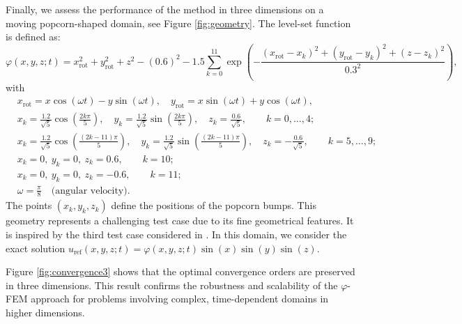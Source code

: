 \documentclass[11pt,a4paper]{article}
\theoremstyle{plain}
\theoremstyle{definition}
\theoremstyle{remark}
\numberwithin{equation}{section}
\begin{document}
\noindent Finally, we assess the performance of the method in three dimensions on a moving popcorn-shaped domain, see Figure \ref{fig:geometry}. The level-set function is defined as:
\begin{equation*}
    \varphi(x,y,z;t) = x_{\text{rot}}^2 + y_{\text{rot}}^2 + z^2 - (0.6)^2 - 1.5 \sum_{k=0}^{11} \exp \left(-\frac{(x_{\text{rot}} - x_k)^2 + (y_{\text{rot}} - y_k)^2 + (z - z_k)^2}{0.3^2} \right),
\end{equation*}
with
\begin{align*}
    &x_{\text{rot}} = x \cos(\omega t) - y \sin(\omega t), \quad 
    y_{\text{rot}} = x \sin(\omega t) + y \cos(\omega t),\\
    &x_k = \frac{1.2}{\sqrt{5}} \cos\left(\frac{2 k \pi}{5}\right),\quad
    y_k = \frac{1.2}{\sqrt{5}} \sin\left(\frac{2 k \pi}{5}\right),\quad
    z_k = \frac{0.6}{\sqrt{5}}, \qquad k=0,\dots,4;\\
    &x_k = \frac{1.2}{\sqrt{5}} \cos\left(\frac{(2k - 11)\pi}{5}\right),\quad
    y_k = \frac{1.2}{\sqrt{5}} \sin\left(\frac{(2k - 11)\pi}{5}\right),\quad
    z_k = -\frac{0.6}{\sqrt{5}}, \qquad k=5,\dots,9;\\
    &x_k = 0,\ y_k = 0,\ z_k = 0.6, \qquad k=10;\\
    &x_k = 0,\ y_k = 0,\ z_k = -0.6, \qquad k=11;\\
    &\omega = \frac{\pi}{8} \quad \text{(angular velocity)}.
\end{align*}
The points $(x_k,y_k,z_k)$ define the positions of the popcorn bumps. This geometry represents a challenging test case due to its fine {geometrical} features. It is inspired by the third test case considered in \cite{heat}.%
In this domain, we consider the exact solution $u_{\mathrm{ref}}(x,y,z;t)=\varphi(x,y,z;t)\sin(x)\sin(y)\sin(z)$.

Figure \ref{fig:convergence3} shows that the optimal convergence orders are preserved in three dimensions. This result confirms the robustness and scalability of the $\varphi$-FEM approach for problems involving complex, time-dependent domains in higher dimensions.
\end{document}
